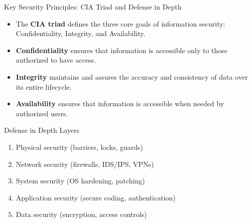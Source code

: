 \documentclass{beamer}
\begin{document}
\begin{frame}{Key Security Principles: CIA Triad and Defense in Depth}
\begin{itemize}
    \item The \textbf{CIA triad} defines the three core goals of information security: Confidentiality, Integrity, and Availability.
    \item \textbf{Confidentiality} ensures that information is accessible only to those authorized to have access.
    \item \textbf{Integrity} maintains and assures the accuracy and consistency of data over its entire lifecycle.
    \item \textbf{Availability} ensures that information is accessible when needed by authorized users.
\end{itemize}

\begin{alertblock}{Defense in Depth Layers}
\begin{enumerate}
    \item Physical security (barriers, locks, guards)
    \item Network security (firewalls, IDS/IPS, VPNs)
    \item System security (OS hardening, patching)
    \item Application security (secure coding, authentication)
    \item Data security (encryption, access controls)
\end{enumerate}
\end{alertblock}
\end{frame}
\end{document}
